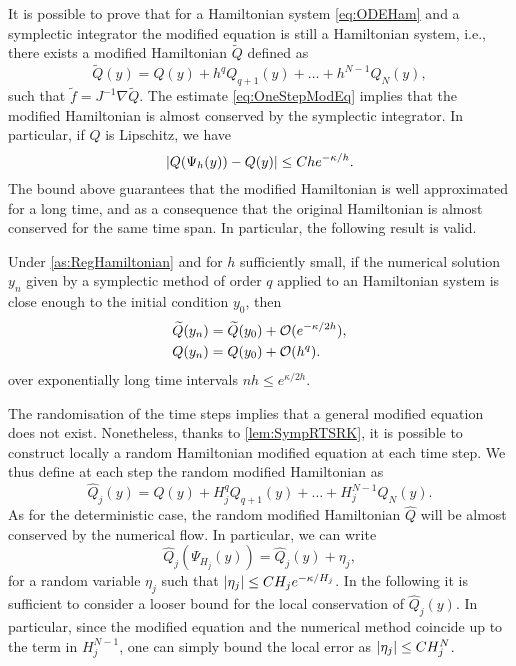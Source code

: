 \documentclass[10pt]{article}
\begin{document}
It is possible to prove that for a Hamiltonian system \eqref{eq:ODEHam} and a symplectic integrator the modified equation is still a Hamiltonian system, i.e., there exists a modified Hamiltonian $\tilde Q$ defined as
\begin{equation}\label{eq:ModifiedHamiltonianTrunc}
	\tilde Q(y) = Q(y) + h^q Q_{q+1}(y) + \ldots + h^{N-1} Q_N(y),
\end{equation}
such that $\tilde f = J^{-1} \nabla \tilde Q$. The estimate \eqref{eq:OneStepModEq} implies that the modified Hamiltonian is almost conserved by the symplectic integrator. In particular, if $Q$ is Lipschitz, we have
\begin{equation}
	\lvert Q(\Psi_h(y)) - Q(y)\rvert \leq Che^{-\kappa/h}.
\end{equation}
The bound above guarantees that the modified Hamiltonian is well approximated for a long time, and as a consequence that the original Hamiltonian is almost conserved for the same time span. In particular, the following result is valid.
\begin{theorem} Under \cref{as:RegHamiltonian} and for $h$ sufficiently small, if the numerical solution $y_n$ given by a symplectic method of order $q$ applied to an Hamiltonian system is close enough to the initial condition $y_0$, then 
	\begin{equation}
	\begin{aligned}
	\widetilde Q(y_n) &= \widetilde Q(y_0) + \mathcal{O}(e^{-\kappa / 2h}), \\
	Q(y_n) &= Q(y_0) + \mathcal{O}(h^q).
	\end{aligned}
	\end{equation}
	over exponentially long time intervals $nh \leq e^{\kappa / 2h}$.
\end{theorem}
The randomisation of the time steps implies that a general modified equation does not exist. Nonetheless, thanks to \cref{lem:SympRTSRK}, it is possible to construct locally a random Hamiltonian modified equation at each time step. We thus define at each step the random modified Hamiltonian as
\begin{equation}
	\hat Q_j(y) = Q(y) + H_j^q Q_{q+1}(y) + \ldots + H_j^{N-1} Q_N(y).
\end{equation}
As for the deterministic case, the random modified Hamiltonian $\hat Q$ will be almost conserved by the numerical flow. In particular, we can write
\begin{equation}
	\hat Q_j(\Psi_{H_j}(y)) = \hat Q_j(y) + \eta_j,
\end{equation} 
for a random variable $\eta_j$ such that $\lvert\eta_j\rvert \leq C H_j e^{-\kappa / H_j}$. In the following it is sufficient to consider a looser bound for the local conservation of $\hat Q_j(y)$. In particular, since the modified equation and the numerical method coincide up to the term in $H_j^{N-1}$, one can simply bound the local error as $\lvert\eta_j\rvert \leq CH_j^{N}$.
\end{document}
